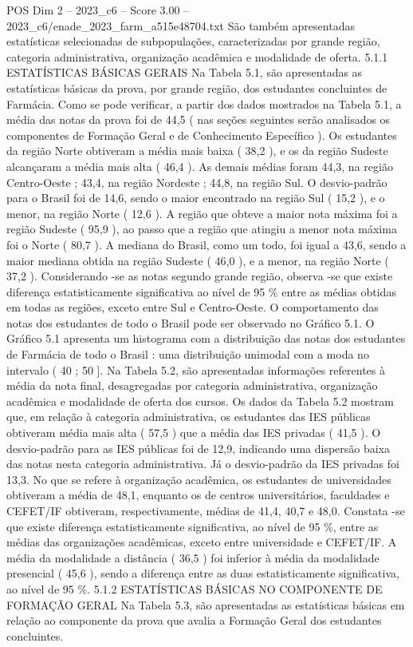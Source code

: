 \begin{textsample}{POS Dim 2 – 2023\_c6 – Score 3.00 – 2023\_c6/enade\_2023\_farm\_a515e48704.txt}
São também apresentadas estatísticas selecionadas de subpopulações, caracterizadas por grande região, categoria administrativa, organização acadêmica e modalidade de oferta. 5.1.1 ESTATÍSTICAS BÁSICAS GERAIS Na Tabela 5.1, são apresentadas as estatísticas básicas da prova, por grande região, dos estudantes concluintes de Farmácia.
Como se pode verificar, a partir dos dados mostrados na Tabela 5.1, a média das notas da prova foi de 44,5 ( nas seções seguintes serão analisados os componentes de Formação Geral e de Conhecimento Específico ).
Os estudantes da região Norte obtiveram a média mais baixa ( 38,2 ), e os da região Sudeste alcançaram a média mais alta ( 46,4 ).
As demais médias foram 44,3, na região Centro-Oeste ; 43,4, na região Nordeste ; 44,8, na região Sul.
O desvio-padrão para o Brasil foi de 14,6, sendo o maior encontrado na região Sul ( 15,2 ), e o menor, na região Norte ( 12,6 ).
A região que obteve a maior nota máxima foi a região Sudeste ( 95,9 ), ao passo que a região que atingiu a menor nota máxima foi o Norte ( 80,7 ).
A mediana do Brasil, como um todo, foi igual a 43,6, sendo a maior mediana obtida na região Sudeste ( 46,0 ), e a menor, na região Norte ( 37,2 ).
Considerando -se as notas segundo grande região, observa -se que existe diferença estatisticamente significativa ao nível de 95 \% entre as médias obtidas em todas as regiões, exceto entre Sul e Centro-Oeste.
O comportamento das notas dos estudantes de todo o Brasil pode ser observado no Gráfico 5.1.
O Gráfico 5.1 apresenta um histograma com a distribuição das notas dos estudantes de Farmácia de todo o Brasil : uma distribuição unimodal com a moda no intervalo ( 40 ; 50 ].
Na Tabela 5.2, são apresentadas informações referentes à média da nota final, desagregadas por categoria administrativa, organização acadêmica e modalidade de oferta dos cursos.
Os dados da Tabela 5.2 mostram que, em relação à categoria administrativa, os estudantes das IES públicas obtiveram média mais alta ( 57,5 ) que a média das IES privadas ( 41,5 ).
O desvio-padrão para as IES públicas foi de 12,9, indicando uma dispersão baixa das notas nesta categoria administrativa.
Já o desvio-padrão da IES privadas foi 13,3.
No que se refere à organização acadêmica, os estudantes de universidades obtiveram a média de 48,1, enquanto os de centros universitários, faculdades e CEFET/IF obtiveram, respectivamente, médias de 41,4, 40,7 e 48,0.
Constata -se que existe diferença estatisticamente significativa, ao nível de 95 \%, entre as médias das organizações acadêmicas, exceto entre universidade e CEFET/IF.
A média da modalidade a distância ( 36,5 ) foi inferior à média da modalidade presencial ( 45,6 ), sendo a diferença entre as duas estatisticamente significativa, ao nível de 95 \%. 5.1.2 ESTATÍSTICAS BÁSICAS NO COMPONENTE DE FORMAÇÃO GERAL Na Tabela 5.3, são apresentadas as estatísticas básicas em relação ao componente da prova que avalia a Formação Geral dos estudantes concluintes.

\end{textsample}
